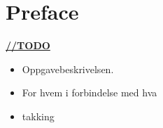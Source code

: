 \chapter*{Preface}

\underline{\textbf{\LARGE //TODO}}
\begin{itemize}
\item Oppgavebeskrivelsen.
\item For hvem i forbindelse med hva
\item takking
\end{itemize}